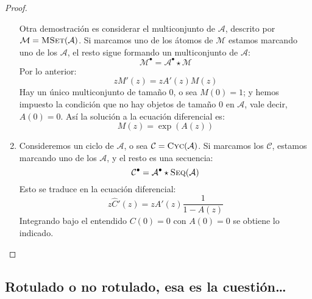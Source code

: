 \begin{proof}
\begin{enumerate}
      Otra demostración es considerar el multiconjunto de \(\mathcal{A}\),
      descrito por \(\mathcal{M} = \operatorname{\textsc{MSet}}(\mathcal{A})\).
      Si marcamos uno de los átomos de \(\mathcal{M}\)
      estamos marcando uno de los \(\mathcal{A}\),
      el resto sigue formando un multiconjunto de \(\mathcal{A}\):
      \begin{equation*}
	\mathcal{M}^\bullet
	  = \mathcal{A}^\bullet \star \mathcal{M}
      \end{equation*}
      Por lo anterior:
      \begin{equation*}
	z M'(z)
	  = z A'(z) M(z)
      \end{equation*}
      Hay un único multiconjunto de tamaño \(0\),
      o sea \(M(0) = 1\);
      y hemos impuesto la condición
      que no hay objetos de tamaño \(0\) en \(\mathcal{A}\),
      vale decir,
      \(A(0) = 0\).
      Así la solución a la ecuación diferencial es:
      \begin{equation*}
	M(z)
	  = \exp(A(z))
      \end{equation*}
    \item %
      Consideremos un ciclo de \(\mathcal{A}\),
      o sea \(\mathcal{C} = \operatorname{\textsc{Cyc}}(\mathcal{A})\).
      Si marcamos los \(\mathcal{C}\),
      estamos marcando uno de los \(\mathcal{A}\),
      y el resto es una secuencia:
      \begin{equation*}
	\mathcal{C}^\bullet
	  = \mathcal{A}^\bullet \star \operatorname{\textsc{Seq}}(\mathcal{A})
      \end{equation*}
      Esto se traduce en la ecuación diferencial:
      \begin{equation*}
	z \widehat{C}'(z)
	  = z A'(z) \frac{1}{1 - A(z)}
      \end{equation*}
      Integrando bajo el entendido \(C(0) = 0\) con \(A(0) = 0\)
      se obtiene lo indicado.
      \qedhere
    \end{enumerate}
  \end{proof}

\subsection{Rotulado o no rotulado, esa es la cuestión\ldots}
\label{sec:rotulado-o-no}

